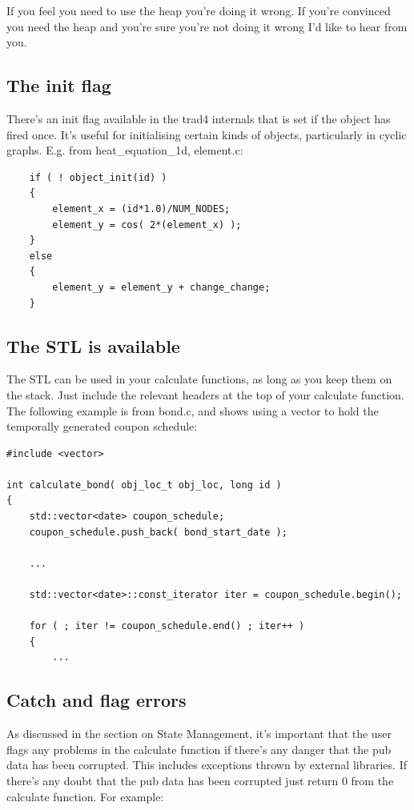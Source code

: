 \documentclass{report}
\begin{document}
If you feel you need to use the heap you're doing it wrong. If you're convinced you need the heap and you're sure you're not doing it wrong I'd like to hear from you.

\subsection{The init flag}

There's an init flag available in the trad4 internals that is set if the object has fired once. It's useful for initialising certain kinds of objects, particularly in cyclic graphs. E.g. from heat_equation_1d, element.c:

\begin{verbatim}
    if ( ! object_init(id) )
    {
        element_x = (id*1.0)/NUM_NODES;
        element_y = cos( 2*(element_x) );
    }
    else
    {
        element_y = element_y + change_change;
    }
\end{verbatim}

\subsection{The STL is available}

The STL  can be used in your calculate functions, as long as you keep them on the stack. Just include the relevant headers at the top of your calculate function. The following example is from bond.c, and shows using a vector to hold the temporally generated coupon schedule:

\begin{verbatim}
#include <vector>

int calculate_bond( obj_loc_t obj_loc, long id )
{
    std::vector<date> coupon_schedule;
    coupon_schedule.push_back( bond_start_date );

    ...

    std::vector<date>::const_iterator iter = coupon_schedule.begin();

    for ( ; iter != coupon_schedule.end() ; iter++ )
    {
        ...
\end{verbatim}


\subsection{Catch and flag errors}

As discussed in the section on State Management, it's important that the user flags any problems in the calculate function if there's any danger that the pub data has been corrupted. This includes exceptions thrown by external libraries. If there's any doubt that the pub data has been corrupted just return 0 from the calculate function. For example:
\end{document}
